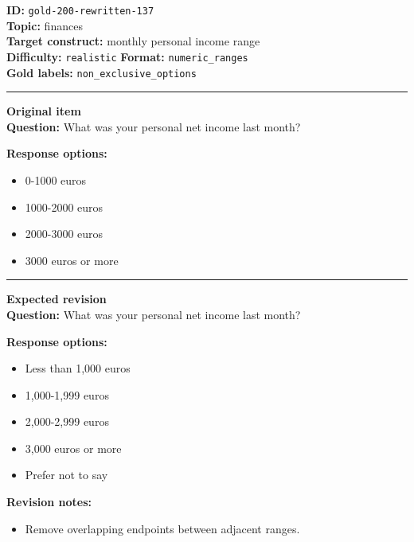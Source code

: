 \documentclass[10pt,a4paper]{article}
\newcommand{\sectionline}{\vspace{0.15em}\hrule\vspace{0.35em}}
\begin{document}
\begin{tcolorbox}[colframe=FlawRed,colback=white,colbacktitle=FlawRed!9,coltitle=black,title={Item 137\hfill Flawed item}]
\textbf{ID:} \texttt{gold-200-rewritten-137}\\
\textbf{Topic:} finances\\
\textbf{Target construct:} monthly personal income range\\
\textbf{Difficulty:} \texttt{realistic} \quad \textbf{Format:} \texttt{numeric\_ranges}\\
\textbf{Gold labels:} \texttt{non\_exclusive\_options}\\
\sectionline
\textbf{Original item}\\
\textbf{Question:} What was your personal net income last month?
\par\textbf{Response options:}
\begin{itemize}
\item 0-1000 euros
\item 1000-2000 euros
\item 2000-3000 euros
\item 3000 euros or more
\end{itemize}
\sectionline
\textbf{Expected revision}\\
\textbf{Question:} What was your personal net income last month?
\par\textbf{Response options:}
\begin{itemize}
\item Less than 1,000 euros
\item 1,000-1,999 euros
\item 2,000-2,999 euros
\item 3,000 euros or more
\item Prefer not to say
\end{itemize}
\par\textbf{Revision notes:}
\begin{itemize}
\item Remove overlapping endpoints between adjacent ranges.
\end{itemize}
\end{tcolorbox}
\end{document}
